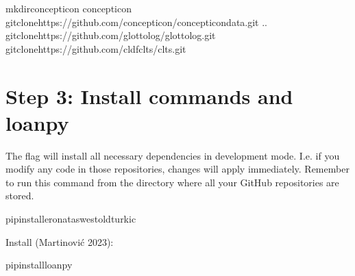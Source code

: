 \documentclass[letterpaper,10pt,english]{sphinxmanual}
\begin{document}
{{{{\begin{sphinxVerbatim}[commandchars=\\\{\}]
mkdirconcepticon
concepticon
gitclonehttps://github.com/concepticon/concepticon\PYGZhy{}data.git
..
gitclonehttps://github.com/glottolog/glottolog.git
gitclonehttps://github.com/cldf\PYGZhy{}clts/clts.git
\end{sphinxVerbatim}


\section{Step 3: Install commands and loanpy}
\label{\detokenize{mkcldf:step-3-install-commands-and-loanpy}}
\sphinxAtStartPar
The  flag will install all necessary dependencies in development mode.
I.e. if you modify any code in those repositories, changes will apply
immediately. Remember to run this command from the directory where
all your GitHub repositories are stored.

\begin{sphinxVerbatim}[commandchars=\\\{\}]
pipinstall\PYGZhy{}eronataswestoldturkic
\end{sphinxVerbatim}

\sphinxAtStartPar
Install 
(Martinović 2023):

\begin{sphinxVerbatim}[commandchars=\\\{\}]
pipinstallloanpy
\end{sphinxVerbatim}


}}}}
\end{document}
